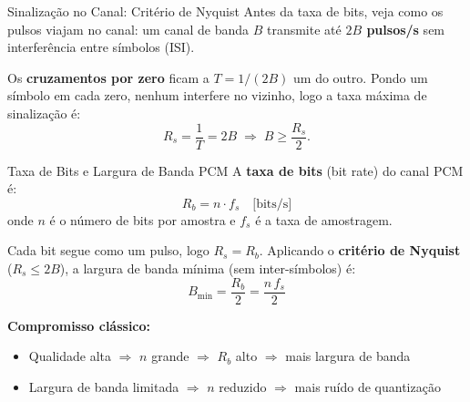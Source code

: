 \begin{frame}{Sinalização no Canal: Critério de Nyquist}
  Antes da taxa de bits, veja como os pulsos viajam no canal: um canal de
  banda $B$ transmite até \textbf{$2B$ pulsos/s} sem interferência entre
  símbolos (ISI).

  \vspace{0.05cm}
  \begin{center}
  \end{center}

  \vspace{-0.05cm}
  Os \textbf{cruzamentos por zero} ficam a $T = 1/(2B)$ um do outro.
  Pondo um símbolo em cada zero, nenhum interfere no vizinho, logo a taxa
  máxima de sinalização é:
  \[
    R_s = \frac{1}{T} = 2B \;\Longrightarrow\; B \ge \frac{R_s}{2}.
  \]
\end{frame}


\begin{frame}{Taxa de Bits e Largura de Banda PCM}
  A \textbf{taxa de bits} (bit rate) do canal PCM é:
  \[
    R_b = n \cdot f_s \quad \text{[bits/s]}
  \]
  onde $n$ é o número de bits por amostra e
  $f_s$ é a taxa de amostragem.

  \vspace{0.35cm}
  Cada bit segue como um pulso, logo $R_s = R_b$. Aplicando o
  \textbf{critério de Nyquist} ($R_s \le 2B$), a largura de banda mínima
  (sem inter-símbolos) é:
  \[
    B_{\min} = \frac{R_b}{2} = \frac{n\,f_s}{2}
  \]

  \vspace{0.35cm}
  \textbf{Compromisso clássico:}
  \begin{itemize}
    \item Qualidade alta $\Rightarrow$ $n$ grande $\Rightarrow$ $R_b$ alto
          $\Rightarrow$ mais largura de banda
    \item Largura de banda limitada $\Rightarrow$ $n$ reduzido
          $\Rightarrow$ mais ruído de quantização
  \end{itemize}
\end{frame}

